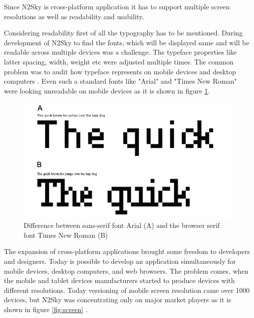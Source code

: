 Since N2Sky is cross-platform application it has to support multiple screen resolutions as well as readability and usability. 

Considering readability first of all the typography has to be mentioned. During development of N2Sky to find the fonts, which will be displayed same and will be readable across multiple devices was a challenge. The typeface \cite{wiki:typeface} properties like latter spacing, width, weight etc were adjusted multiple times. The common problem was to audit how typeface represents on mobile devices and desktop computers \cite{responsive_book}. Even such a standard fonts like "Arial" and "Times New Roman" were looking unreadable on mobile devices as it is shown in figure \ref{fig:typo}.

\begin{figure}[H]
\begin{center}
  \includegraphics[scale=0.5]{components/3/components/typo.png}
  \caption{Difference between sans-serif font Arial (A) and the browser serif font Times New Roman (B) }
  \label{fig:typo}
\end{center}
\end{figure}

The expansion of cross-platform applications brought some freedom to developers and designers. Today is possible to develop an application simultaneously for mobile devices, desktop computers, and web browsers. The problem comes, when the mobile and tablet devices manufacturers started to produce devices with different resolutions. Today versioning of mobile screen resolution came over 1000 devices, but N2Sky was concentrating only on major market players as it is shown in figure \ref{fig:screen} \cite{mobile_resolution}.

